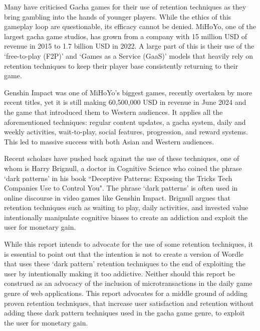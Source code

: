 Many have criticised Gacha games for their use of retention techniques as they bring gambling into the hands of younger players.\cite{Yang2022} While the ethics of this gameplay loop are questionable, its efficacy cannot be denied. MiHoYo, one of the largest gacha game studios, has grown from a company with 15 million USD of revenue in 2015 to 1.7 billion USD in 2022.\cite{Pingwest2023} A large part of this is their use of the ‘free-to-play (F2P)’ and ‘Games as a Service (GaaS)’ models that heavily rely on retention techniques to keep their player base consistently returning to their game.\cite{Bernik2023}

Genshin Impact was one of MiHoYo's biggest games, recently overtaken by more recent titles, yet it is still making 60,500,000 USD in revenue in June 2024 and the game that introduced them to Western audiences.\cite{Gacha2024} It applies all the aforementioned techniques: regular content updates, a gacha system, daily and weekly activities, wait-to-play, social features, progression, and reward systems. This led to massive success with both Asian and Western audiences.\cite{Greting2022}

Recent scholars have pushed back against the use of these techniques, one of whom is Harry Brignull, a doctor in Cognitive Science who coined the phrase ‘dark patterns’ in his book ``Deceptive Patterns: Exposing the Tricks Tech Companies Use to Control You".\cite{Brignull2023} The phrase `dark patterns' is often used in online discourse in video games like Genshin Impact. Brignull argues that retention techniques such as waiting to play, daily activities, and invested value intentionally manipulate cognitive biases to create an addiction and exploit the user for monetary gain.\cite{Brignull2023}

While this report intends to advocate for the use of some retention techniques, it is essential to point out that the intention is not to create a version of Wordle that uses these ‘dark pattern’ retention techniques to the end of exploiting the user by intentionally making it too addictive. Neither should this report be construed as an advocacy of the inclusion of microtransactions in the daily game genre of web applications. This report advocates for a middle ground of adding proven retention techniques, that increase user satisfaction and retention without adding these dark pattern techniques used in the gacha game genre, to exploit the user for monetary gain. 
